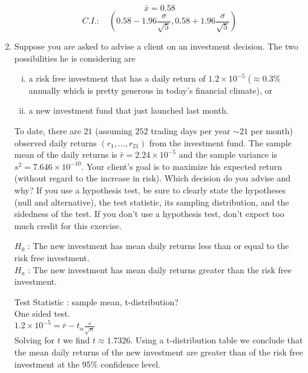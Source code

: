 \documentclass[letterpaper,12pt,fleqn]{article}
\begin{document}
\begin{enumerate}
$$ \bar{x} = 0.58$$
$$C.I. : \quad (0.58 - 1.96\frac{\sigma}{\sqrt{5}},0.58 + 1.96\frac{\sigma}{\sqrt{5}})$$


\vspace{3em}

\item Suppose you are asked to advise a client on an investment decision.  The two possibilities he is considering are

\begin{enumerate}[i)]
\item a risk free investment that has a daily return of $1.2 \times 10^{-5}$ ($\approx 0.3\%$ annually which is pretty generous in today's financial climate), or
\item a new investment fund that just launched last month.
\end{enumerate}

To date, there are $21$ (assuming $252$ trading days per year $\sim21$ per month) observed daily returns $(r_{1}, \dots, r_{21})$ from the investment fund.  The sample mean of the daily returns is $\bar{r} = 2.24 \times 10^{-5}$ and the sample variance is $s^{2} = 7.646 \times 10^{-10}$.  Your client's goal is to maximize his expected return (without regard to the increase in risk).  Which decision do you advise and why?  If you use a hypothesis test, be sure to clearly state the  hypotheses (null and alternative), the test statistic, its sampling distribution, and the sidedness of the test.  If you don't use a hypothesis test, don't expect too much credit for this exercise.


$H_0$ : The new investment has mean daily returns less than or equal to the risk free investment. \\

$H_a$ : The new investment has mean daily returns greater than the risk free investment.

Test Statistic : sample mean, t-distribution?\\

One sided test.\\

$1.2 \times 10^{-5} = \bar{r} - t_{\alpha} \frac{s}{\sqrt{n}}$ \\

Solving for $t$ we find $t \approx 1.7326$. Using a t-distribution table we conclude that the mean daily returns of the new investment are greater than of the risk free investment at the 95\% confidence level. 



\end{enumerate}
\end{document}
